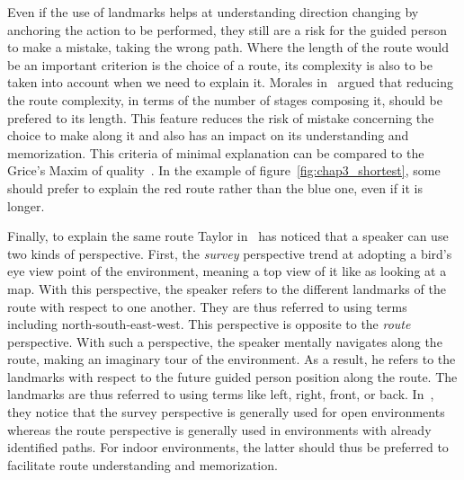 Even if the use of landmarks helps at understanding direction changing by anchoring the action to be performed, they still are a risk for the guided person to make a mistake, taking the wrong path. Where the length of the route would be an important criterion is the choice of a route, its complexity is also to be taken into account when we need to explain it. Morales in~\cite{morales_2015_building} argued that reducing the route complexity, in terms of the number of stages composing it, should be prefered to its length. This feature reduces the risk of mistake concerning the choice to make along it and also has an impact on its understanding and memorization. This criteria of minimal explanation can be compared to the Grice's Maxim of quality~\cite{grice_1975_logic}. In the example of figure~\ref{fig:chap3_shortest}, some should prefer to explain the red route rather than the blue one, even if it is longer.

Finally, to explain the same route Taylor in~\cite{taylor_1992_spatial} has noticed that a speaker can use two kinds of perspective. First, the \textit{survey} perspective trend at adopting a bird's eye view point of the environment, meaning a top view of it like as looking at a map. With this perspective, the speaker refers to the different landmarks of the route with respect to one another. They are thus referred to using terms including north-south-east-west. This perspective is opposite to the \textit{route} perspective. With such a perspective, the speaker mentally navigates along the route, making an imaginary tour of the environment. As a result, he refers to the landmarks with respect to the future guided person position along the route. The landmarks are thus referred to using terms like left, right, front, or back. In~\cite{taylor_1996_perspective}, they notice that the survey perspective is generally used for open environments whereas the route perspective is generally used in environments with already identified paths. For indoor environments, the latter should thus be preferred to facilitate route understanding and memorization.



